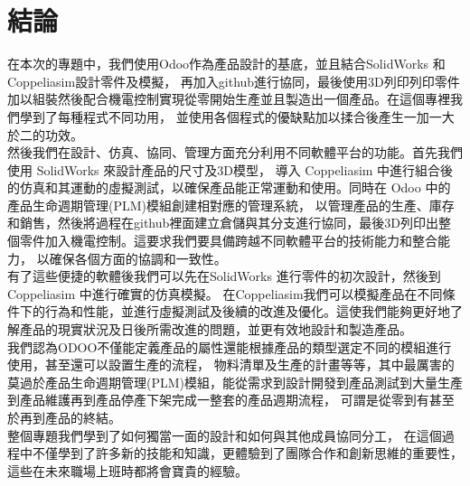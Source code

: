 \chapter{結論}
\renewcommand{\baselinestretch}{10.0} %


\fontsize{14pt}{2.5pt}\sectionef\hspace{12pt}


在本次的專題中，我們使用Odoo作為產品設計的基底，並且結合SolidWorks 和 Coppeliasim設計零件及模擬，
再加入github進行協同，最後使用3D列印列印零件加以組裝然後配合機電控制實現從零開始生產並且製造出一個產品。在這個專裡我們學到了每種程式不同功用，
並使用各個程式的優缺點加以揉合後產生一加一大於二的功效。\\



然後我們在設計、仿真、協同、管理方面充分利用不同軟體平台的功能。首先我們使用 SolidWorks 來設計產品的尺寸及3D模型，
導入 Coppeliasim 中進行組合後的仿真和其運動的虛擬測試，以確保產品能正常運動和使用。同時在 Odoo 中的產品生命週期管理(PLM)模組創建相對應的管理系統，
以管理產品的生產、庫存和銷售，然後將過程在github裡面建立倉儲與其分支進行協同，最後3D列印出整個零件加入機電控制。這要求我們要具備跨越不同軟體平台的技術能力和整合能力，
以確保各個方面的協調和一致性。\\


有了這些便捷的軟體後我們可以先在SolidWorks 進行零件的初次設計，然後到Coppeliasim 中進行確實的仿真模擬。
在Coppeliasim我們可以模擬產品在不同條件下的行為和性能，並進行虛擬測試及後續的改進及優化。這使我們能夠更好地了解產品的現實狀況及日後所需改進的問題，並更有效地設計和製造產品。\\


我們認為ODOO不僅能定義產品的屬性還能根據產品的類型選定不同的模組進行使用，甚至還可以設置生產的流程，
物料清單及生產的計畫等等，其中最厲害的莫過於產品生命週期管理(PLM)模組，能從需求到設計開發到產品測試到大量生產到產品維護再到產品停產下架完成一整套的產品週期流程，
可謂是從零到有甚至於再到產品的終結。\\


整個專題我們學到了如何獨當一面的設計和如何與其他成員協同分工，
在這個過程中不僅學到了許多新的技能和知識，更體驗到了團隊合作和創新思維的重要性，這些在未來職場上班時都將會寶貴的經驗。\\




\newpage

\renewcommand{\baselinestretch}{0.5} %